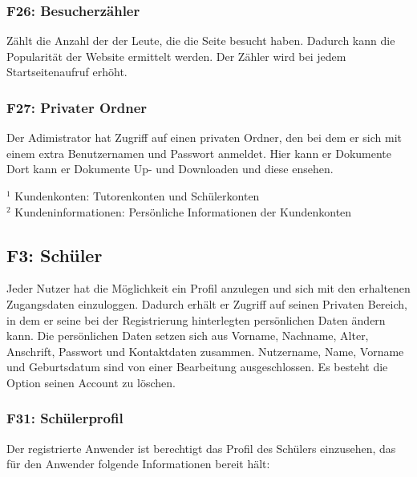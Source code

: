 \documentclass[10pt,a4paper]{scrartcl}
\begin{document}
\subsubsection*{F26: Besucherzähler}

Zählt die Anzahl der der Leute, die die Seite besucht haben. Dadurch kann die Popularität der Website ermittelt werden.
Der Zähler wird bei jedem Startseitenaufruf erhöht.

\subsubsection*{F27: Privater Ordner}
Der Adimistrator hat Zugriff auf einen privaten Ordner, den bei dem er sich mit einem extra Benutzernamen und Passwort anmeldet. Hier kann er Dokumente 
Dort kann er Dokumente Up- und Downloaden und diese ensehen.

\bigskip

$^1$ Kundenkonten: Tutorenkonten und Schülerkonten\\
$^2$ Kundeninformationen: Persönliche Informationen der Kundenkonten




\subsection{F3: Schüler}
Jeder Nutzer hat die Möglichkeit ein Profil anzulegen und sich mit den erhaltenen Zugangsdaten einzuloggen.
Dadurch erhält er Zugriff auf seinen Privaten Bereich, in dem er seine bei der Registrierung hinterlegten persönlichen Daten ändern kann.
Die persönlichen Daten setzen sich aus Vorname, Nachname, Alter, Anschrift, Passwort und Kontaktdaten zusammen.
Nutzername, Name, Vorname und Geburtsdatum sind von einer Bearbeitung ausgeschlossen.
Es besteht die Option seinen Account zu löschen.

%

\subsubsection*{F31: Schülerprofil}

Der registrierte Anwender ist berechtigt das Profil des Schülers einzusehen, das für den Anwender folgende Informationen bereit hält:
\end{document}
